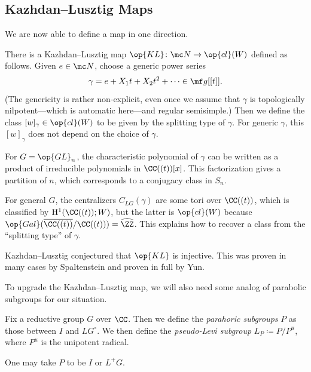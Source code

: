 \documentclass[../notes.tex]{subfiles}
\begin{document}
\subsection{Kazhdan--Lusztig Maps}
We are now able to define a map in one direction.
\begin{definition}
	There is a Kazhdan--Lusztig map $\op{KL}\colon\mc N\to\op{cl}(W)$ defined as follows. Given $e\in\mc N$, choose a generic power series
	\[\gamma=e+X_1t+X_2t^2+\cdots\in\mf g[[t]].\]
	(The genericity is rather non-explicit, even once we assume that $\gamma$ is topologically nilpotent---which is automatic here---and regular semisimple.)
	Then we define the class $[w]_\gamma\in\op{cl}(W)$ to be given by the splitting type of $\gamma$. For generic $\gamma$, this $[w]_\gamma$ does not depend on the choice of $\gamma$.
\end{definition}
\begin{example}
	For $G=\op{GL}_n$, the characteristic polynomial of $\gamma$ can be written as a product of irreducible polynomials in $\CC((t))[x]$. This factorization gives a partition of $n$, which corresponds to a conjugacy class in $S_n$.
\end{example}
\begin{remark}
	For general $G$, the centralizers $C_{LG}(\gamma)$ are some tori over $\CC((t))$, which is classified by $\mathrm H^1(\CC((t));W)$, but the latter is $\op{cl}(W)$ because $\op{Gal}(\overline{\CC((t))}/\CC((t)))=\widehat{\ZZ}$. This explains how to recover a class from the ``splitting type'' of $\gamma$.
\end{remark}
\begin{remark}
	Kazhdan--Lusztig conjectured that $\op{KL}$ is injective. This was proven in many cases by Spaltenstein and proven in full by Yun.
\end{remark}
To upgrade the Kazhdan--Lusztig map, we will also need some analog of parabolic subgroups for our situation.
\begin{definition}[parahoric]
	Fix a reductive group $G$ over $\CC$. Then we define the \textit{parahoric subgroups} $P$ as those between $I$ and $LG^\circ$. We then define the \textit{pseudo-Levi subgroup} $L_P\coloneqq P/P^u$, where $P^u$ is the unipotent radical.
\end{definition}
\begin{example}
	One may take $P$ to be $I$ or $L^+G$.
\end{example}
\end{document}
